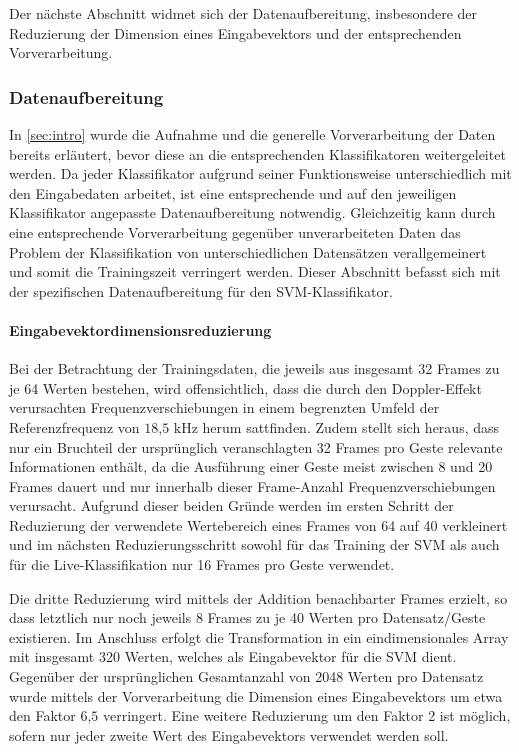 Der nächste Abschnitt widmet sich der Datenaufbereitung, insbesondere der Reduzierung der Dimension eines Eingabevektors und der entsprechenden Vorverarbeitung.

\subsubsection{Datenaufbereitung}\label{sec:svm_data} 
In \autoref{sec:intro} wurde die Aufnahme und die generelle Vorverarbeitung der Daten bereits erläutert, bevor diese an die entsprechenden Klassifikatoren weitergeleitet werden.
Da jeder Klassifikator aufgrund seiner Funktionsweise unterschiedlich mit den Eingabedaten arbeitet, ist eine entsprechende und auf den jeweiligen Klassifikator angepasste Datenaufbereitung notwendig.
Gleichzeitig kann durch eine entsprechende Vorverarbeitung gegenüber unverarbeiteten Daten das Problem der Klassifikation von unterschiedlichen Datensätzen verallgemeinert und somit die Trainingszeit verringert werden.
Dieser Abschnitt befasst sich mit der spezifischen Datenaufbereitung für den \ac{SVM}-Klassifikator.

\paragraph{Eingabevektordimensionsreduzierung}\label{sec:svm_reduce}$\;$ \\
Bei der Betrachtung der Trainingsdaten, die jeweils aus insgesamt 32 Frames zu je 64 Werten bestehen, wird offensichtlich, dass die durch den Doppler-Effekt verursachten Frequenzverschiebungen in einem begrenzten Umfeld der Referenzfrequenz von $18\text{,}5\text{ kHz}$ herum sattfinden.
Zudem stellt sich heraus, dass nur ein Bruchteil der ursprünglich veranschlagten 32 Frames pro Geste relevante Informationen enthält, da die Ausführung einer Geste meist zwischen 8 und 20 Frames dauert und nur innerhalb dieser Frame-Anzahl Frequenzverschiebungen verursacht.
Aufgrund dieser beiden Gründe werden im ersten Schritt der Reduzierung der verwendete Wertebereich eines Frames von 64 auf 40 verkleinert und im nächsten Reduzierungsschritt sowohl für das Training der \ac{SVM} als auch für die Live-Klassifikation nur 16 Frames pro Geste verwendet. 

Die dritte Reduzierung wird mittels der Addition benachbarter Frames erzielt, so dass letztlich nur noch jeweils 8 Frames zu je 40 Werten pro Datensatz/Geste existieren.
Im Anschluss erfolgt die Transformation in ein eindimensionales Array mit insgesamt 320 Werten, welches als Eingabevektor für die \ac{SVM} dient.
Gegenüber der ursprünglichen Gesamtanzahl von 2048 Werten pro Datensatz wurde mittels der Vorverarbeitung die Dimension eines Eingabevektors um etwa den Faktor $6\text{,}5$ verringert.
Eine weitere Reduzierung um den Faktor 2 ist möglich, sofern nur jeder zweite Wert des Eingabevektors verwendet werden soll.

